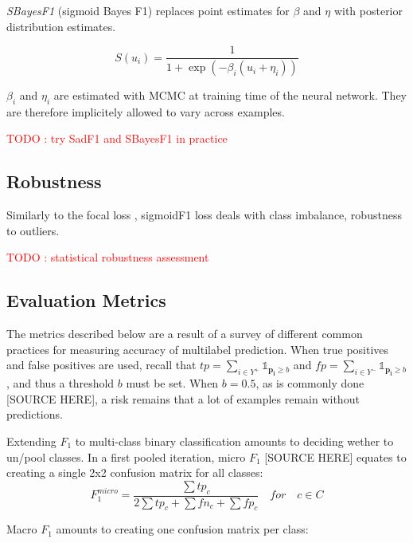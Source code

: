 \documentclass[sigconf,natbib,screen=true,review=true,anonymous]{acmart}
\newcommand\todo[1]{\textcolor{red}{TODO : #1}}
\begin{document}
\emph{SBayesF1} (sigmoid Bayes F1) replaces point estimates for \(\beta\) and \(\eta\) with posterior distribution estimates. 

\begin{equation}
S(u_i) = \frac{1}{1+\exp (-\beta_i (u_i + \eta_i))}
\end{equation}



\(\beta_i\) and \(\eta_i\) are estimated with MCMC at training time of the neural network. They are therefore implicitely allowed to vary across examples.

\todo{try SadF1 and SBayesF1 in practice}


\subsection{Robustness}
\label{sec:org26a1fc9}


Similarly to the focal loss \cite{focalLoss}, sigmoidF1 loss deals with class imbalance, robustness to outliers.

\todo{statistical robustness assessment}



\subsection{Evaluation Metrics}
\label{sec:org72a6e91}

The metrics described below are a result of a survey of different common practices for measuring accuracy of multilabel prediction. When true positives and false positives are used, recall that \(t p=\sum_{i \in Y^{+}} \mathds{1}_{\mathbf{p_i} \geq b}\) and \(f p=\sum_{i \in Y^{-}} \mathds{1}_{\mathbf{p_i} \geq b}\), and thus a threshold \(b\) must be set. When \(b = 0.5\), as is commonly done [SOURCE HERE], a risk remains that a lot of examples remain without predictions.

Extending \(F_1\) to multi-class binary classification amounts to deciding wether to un/pool classes.
In a first pooled iteration, micro \(F_1\) [SOURCE HERE] equates to creating a single 2x2 confusion matrix for all classes:
$$F_1^{micro} = \frac{\sum tp_c}{2 \sum tp_c + \sum fn_c + \sum fp_c} \quad for \quad c \in C$$

Macro \(F_1\) \cite{threshForF1} amounts to creating one confusion matrix per class:
\end{document}
